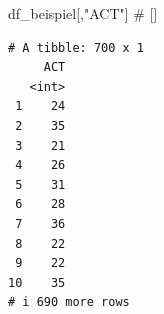 \documentclass[
  letterpaper,
  DIV=11,
  numbers=noendperiod]{scrreprt}
\newenvironment{Shaded}{\begin{snugshade}}{\end{snugshade}}
\newcommand{\CommentTok}[1]{\textcolor[rgb]{0.37,0.37,0.37}{#1}}
\newcommand{\NormalTok}[1]{\textcolor[rgb]{0.00,0.23,0.31}{#1}}
\newcommand{\SpecialCharTok}[1]{\textcolor[rgb]{0.37,0.37,0.37}{#1}}
\newcommand{\StringTok}[1]{\textcolor[rgb]{0.13,0.47,0.30}{#1}}
\begin{document}
\begin{Shaded}
\begin{Highlighting}[]
\NormalTok{df\_beispiel[,}\StringTok{"ACT"}\NormalTok{] }\CommentTok{\# []}
\end{Highlighting}
\end{Shaded}

\begin{verbatim}
# A tibble: 700 x 1
     ACT
   <int>
 1    24
 2    35
 3    21
 4    26
 5    31
 6    28
 7    36
 8    22
 9    22
10    35
# i 690 more rows
\end{verbatim}

\begin{Shaded}
\end{Shaded}
\end{document}
